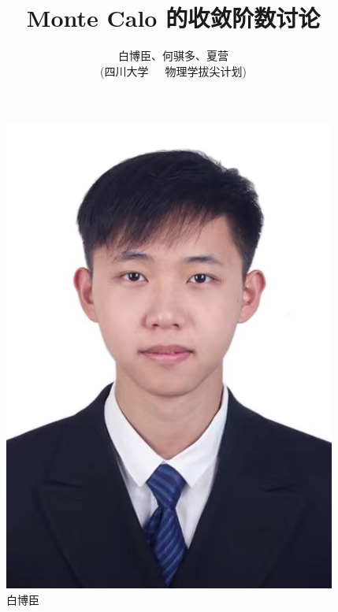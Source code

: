 \documentclass[12pt,a4paper]{article}%
\title{\fontsize{18pt}{27pt}\selectfont%
{\heiti%
Monte Calo 的收敛阶数讨论}}%
\author{\fontsize{12pt}{18pt}\selectfont%
{\fangsong%
白博臣、何骐多、夏营}\\%
\fontsize{10.5pt}{15.75pt}\selectfont%
{\fangsong%
(四川大学~~~物理学拔尖计划)}}%
\date{}%
\begin{document}
    \maketitle%
    \lhead{}%
    \chead{}%
    \rhead{}%
    \lfoot{}%
    \cfoot{\thepage}%
    \rfoot{}%
    \begin{figure}[h]
        \centering
        \begin{minipage}{0.32\textwidth}
            \centering
            \includegraphics[width=\linewidth]{bbc}
            \caption{白博臣}
            \label{fig:img1}
        \end{minipage}\hfill
        \begin{minipage}{0.305\textwidth}

\end{minipage}
\end{figure}
\end{document}
